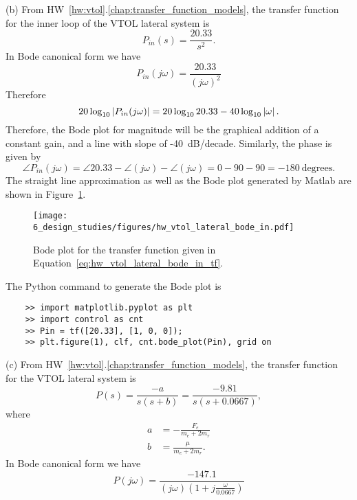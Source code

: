 (b) From HW~\ref{hw:vtol}.\ref{chap:transfer_function_models}, the transfer function for the inner loop of the VTOL lateral system is 
\begin{equation}\label{eq:hw_vtol_lateral_bode_in_tf}
P_{in}(s) = \frac{20.33}{s^2}.
\end{equation}
In Bode canonical form we have
\[
P_{in}(j\omega) = \frac{20.33}{(j\omega)^2}
\]
Therefore
\[
20\log_{10}\left|P_{in}(j\omega)\right|=
	20\log_{10} 20.33 
	-40\log_{10}\left|\omega\right|.
\]
Therefore, the Bode plot for magnitude will be the graphical addition of a constant gain, and a line with slope of -40~dB/decade.
Similarly, the phase is given by
\[
\angle P_{in}(j\omega) = 
	\angle 20.33 
	- \angle (j\omega)
	- \angle (j\omega) = 0 - 90 - 90 = -180~\text{degrees}.
\]
The straight line approximation as well as the Bode plot generated by Matlab are shown in Figure~\ref{fig:hw_vtol_lateral_bode_in}.
\begin{figure}[H]
   \centering
   \texttt{[image: 6\_design\_studies/figures/hw\_vtol\_lateral\_bode\_in.pdf]}
   \caption{Bode plot for the transfer function given in Equation~\eqref{eq:hw_vtol_lateral_bode_in_tf}.}
   \label{fig:hw_vtol_lateral_bode_in}
\end{figure}
The Python command to generate the Bode plot is
\begin{lstlisting}
	>> import matplotlib.pyplot as plt
	>> import control as cnt
	>> Pin = tf([20.33], [1, 0, 0]);
	>> plt.figure(1), clf, cnt.bode_plot(Pin), grid on
\end{lstlisting}

(c) From HW~\ref{hw:vtol}.\ref{chap:transfer_function_models}, the transfer function for the VTOL lateral system is 
\begin{equation}\label{eq:hw_vtol_lateral_bode_tf_out}
P(s) = \frac{-a}{s(s+b)} = \frac{-9.81}{s(s+0.0667)},
\end{equation}
where
\begin{align*}
a &= -\frac{F_e}{m_e+2m_r} \\
b &= \frac{\mu}{m_c+2m_r}.	
\end{align*}
In Bode canonical form we have
\[
P(j\omega) = \frac{-147.1}{(j\omega)(1+j\frac{\omega}{0.0667})}
\]

